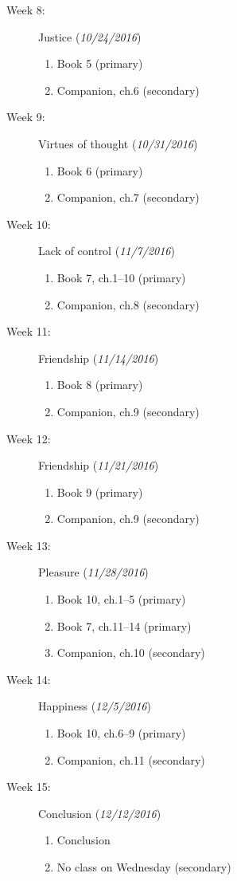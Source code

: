 \documentclass[article,oneside]{memoir}
\begin{document}
\begin{description}
\item[Week 8:] Justice  (\emph{10/24/2016})
\begin{enumerate}
\item Book 5 (primary)
\item Companion, ch.6 (secondary)
\end{enumerate}


\item[Week 9:] Virtues of thought (\emph{10/31/2016})
\begin{enumerate}
\item Book 6 (primary)
\item Companion, ch.7 (secondary)
\end{enumerate}

\item[Week 10:] Lack of control  (\emph{11/7/2016})
\begin{enumerate}
\item Book 7, ch.1--10 (primary)
\item Companion, ch.8 (secondary)
\end{enumerate}


\item[Week 11:] Friendship (\emph{11/14/2016})
\begin{enumerate}
\item Book 8 (primary)
\item Companion, ch.9 (secondary)
\end{enumerate}


\item[Week 12:] Friendship  (\emph{11/21/2016})
\begin{enumerate}
\item Book 9 (primary)
\item Companion, ch.9 (secondary)
\end{enumerate}


\item[Week 13:]  Pleasure (\emph{11/28/2016})
\begin{enumerate}
\item Book 10, ch.1--5 (primary)
\item  Book 7, ch.11--14 (primary)
\item Companion, ch.10 (secondary)
\end{enumerate}

\item[Week 14:]  Happiness (\emph{12/5/2016})
\begin{enumerate}
\item Book 10, ch.6--9 (primary)
\item Companion, ch.11 (secondary)
\end{enumerate}

\item[Week 15:] Conclusion (\emph{12/12/2016})
\begin{enumerate}
\item Conclusion
\item No class on Wednesday (secondary)
\end{enumerate}



\end{description}
\end{document}
